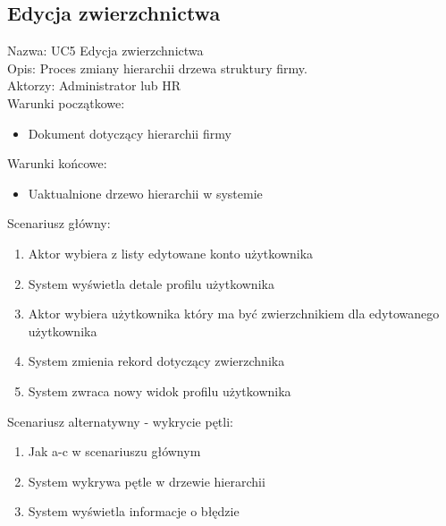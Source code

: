 \subsection{Edycja zwierzchnictwa}
Nazwa: UC5 Edycja zwierzchnictwa \\
Opis: Proces zmiany hierarchii drzewa struktury firmy. \\
Aktorzy: Administrator lub HR \\
Warunki początkowe:
\begin{itemize}
\item Dokument dotyczący hierarchii firmy
\end{itemize}
Warunki końcowe:
\begin{itemize}
\item Uaktualnione drzewo hierarchii w systemie 
\end{itemize}
Scenariusz główny:
\begin{enumerate}
\item Aktor wybiera z listy edytowane konto użytkownika
\item System wyświetla detale profilu użytkownika
\item Aktor wybiera użytkownika który ma być zwierzchnikiem dla edytowanego użytkownika
\item System zmienia rekord dotyczący zwierzchnika
\item System zwraca nowy widok profilu użytkownika
\end{enumerate}
Scenariusz alternatywny - wykrycie pętli: 
\begin{enumerate}
\item Jak a-c w scenariuszu głównym
\item System wykrywa pętle w drzewie hierarchii
\item System wyświetla informacje o błędzie
\end{enumerate}

